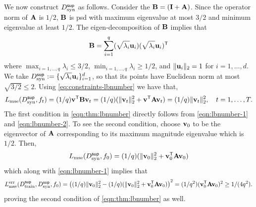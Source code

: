 We now construct $D^{\sf sup}_{\textnormal{syn}}$ as follows. Consider the $\mathbf{B} = (\mathbf{I} + \mathbf{A})$. Since the operator norm of $\mathbf{A}$ is $1/2$, $\mathbf{B}$ is psd with maximum eigenvalue at most $3/2$ and minimum eigenvalue at least $1/2$. The eigen-decomposition of $\mathbf{B}$ implies that 
\begin{equation}
    \mathbf{B} = \sum_{i=1}^q (\sqrt{\lambda_i}{\mathbf{u}}_i)(\sqrt{\lambda_i}{\mathbf{u}}_i)^{\sf T}
\end{equation}
where $\max_{i=1,\dots, q}\lambda_i \leq 3/2$, $\min_{i=1,\dots, q}\lambda_i \geq 1/2$, and $\|{\mathbf{u}}_i\|_2 = 1$ for $i=1,\dots, d$. We take $D^{\sf sup}_{\textnormal{syn}} := \{\sqrt{\lambda_i}{\mathbf{u}}_i\}_{i=1}^d$, so that its points have Euclidean norm at most $\sqrt{3/2} \leq 2$. 
Using \eqref{eq:constraints-lbnumber} we have that,
\begin{equation}\label{eqn:lbnumber-2}
L_{\textnormal{mse}}(D^{\sf sup}_{\textnormal{syn}}, f_t) = (1/q){\mathbf{v}}^{\sf T}\mathbf{B}{\mathbf{v}}_t = (1/q) (\|{\mathbf{v}}_t\|_2^2 + {\mathbf{v}}^{\sf T}\mathbf{A}{\mathbf{v}}_t) = (1/q) \|{\mathbf{v}}_t\|_2^2, \quad t = 1, \dots, T.
\end{equation} 
The first condition in \eqref{eqn:thm:lbnumber} directly follows from \eqref{eqn:lbnumber-1} and \eqref{eqn:lbnumber-2}. To see the second condition, choose ${\mathbf{v}}_0$ to be the eigenvector of $\mathbf{A}$ corresponding to its maximum magnitude eigenvalue which is $1/2$. Then,  
\begin{equation}
    L_{\textnormal{mse}}(D^{\sf sup}_{\textnormal{syn}}, f_0) = (1/q) (\|{\mathbf{v}}_0\|_2^2 + {\mathbf{v}}_0^{\sf T}\mathbf{A}{\mathbf{v}}_0)
\end{equation}
which along with \eqref{eqn:lbnumber-1} implies that 
\begin{equation*}
    L^{\textnormal{err}}_{\textnormal{mse}}(D^{\sf sup}_{\textnormal{train}}, D^{\sf sup}_{\textnormal{syn}}, f_0) = \left((1/q) \|{\mathbf{v}}_0\|_2^2 - (1/q) (\|{\mathbf{v}}_0\|_2^2 + {\mathbf{v}}_0^{\sf T}\mathbf{A}{\mathbf{v}}_0)\right)^2 = (1/q^2)({\mathbf{v}}_0^{\sf T}\mathbf{A}{\mathbf{v}}_0)^2 \geq 1/(4q^2).
\end{equation*}
proving the second condition of \eqref{eqn:thm:lbnumber} as well.


